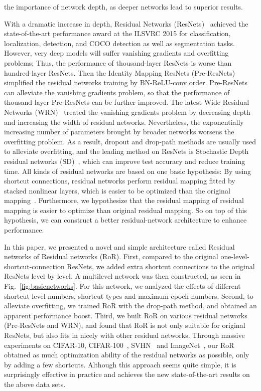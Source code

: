 \documentclass[journal]{IEEEtran}
\begin{document}
the importance of network depth, as deeper networks lead to superior results.
\par
With a dramatic increase in depth, Residual Networks (ResNets)~\cite{he2015resnets} achieved the state-of-the-art performance award at the ILSVRC 2015 for classification, localization, detection, and COCO detection as well as segmentation tasks. However, very deep models will suffer vanishing gradients and overfitting problems; Thus, the performance of thousand-layer ResNets is worse than hundred-layer ResNets. Then the Identity Mapping ResNets (Pre-ResNets)~\cite{he2016preresnets} simplified the residual networks training by BN-ReLU-conv order. Pre-ResNets can alleviate the vanishing gradients problem, so that the performance of thousand-layer Pre-ResNets can be further improved. The latest Wide Residual Networks (WRN)~\cite{zagoruyko2016wrn} treated the vanishing gradients problem by decreasing depth and increasing the width of residual networks. Nevertheless, the exponentially increasing number of parameters brought by broader networks worsens the overfitting problem. As a result, dropout and drop-path methods are usually used to alleviate overfitting, and the leading method on ResNets is Stochastic Depth residual networks (SD)~\cite{huang2016SD}, which can improve test accuracy and reduce training time. All kinds of residual networks are based on one basic hypothesis: By using shortcut connections, residual networks perform residual mapping fitted by stacked nonlinear layers, which is easier to be optimized than the original mapping~\cite{he2015resnets}. Furthermore, we hypothesize that the residual mapping of residual mapping is easier to optimize than original residual mapping. So on top of this hypothesis, we can construct a better residual-network architecture to enhance performance.
\par
In this paper, we presented a novel and simple architecture called Residual networks of Residual networks (RoR). First, compared to the original one-level-shortcut-connection ResNets, we added extra shortcut connections to the original ResNets level by level. A multilevel network was then constructed, as seen in Fig.~\ref{fig:basicnetworks}. For this network, we analyzed the effects of different shortcut level numbers, shortcut types and maximum epoch numbers. Second, to alleviate overfitting, we trained RoR with the drop-path method, and obtained an apparent performance boost. Third, we built RoR on various residual networks (Pre-ResNets and WRN), and found that RoR is not only suitable for original ResNets, but also fits in nicely with other residual networks. Through massive experiments on CIFAR-10, CIFAR-100~\cite{krizhevsky2009cifar}, SVHN~\cite{netzer2011SVHN} and ImageNet~\cite{Russ2014imagenetchallenge}, our RoR obtained as much optimization ability of the residual networks as possible, only by adding a few shortcuts. Although this approach seems quite simple, it is surprisingly effective in practice and achieves the new state-of-the-art results on the above data sets. 
\end{document}

